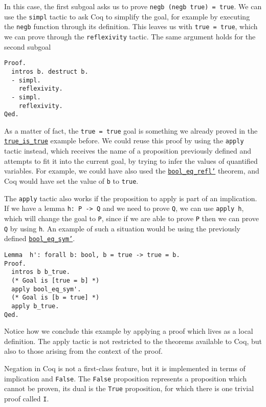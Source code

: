 In this case, the first subgoal asks us to prove \texttt{negb (negb true) = true}.
We can use the \texttt{simpl} tactic to ask Coq to simplify the goal, for example by executing
the \texttt{negb} function through its definition. This leaves us with 
\texttt{true = true}, which we can prove through the \texttt{reflexivity} tactic. The
same argument holds for the second subgoal

\begin{verbatim}
Proof.
  intros b. destruct b.
  - simpl.
    reflexivity.
  - simpl.
    reflexivity. 
Qed.
\end{verbatim}

As a matter of fact, the \texttt{true = true} goal is something we already proved in the
\hyperref[lst:true-is-true]{\texttt{true_is_true}} example before. We could reuse this proof
by using the \texttt{apply} tactic instead, which receives the name of a proposition previously
defined and attempts to fit it into the current goal, by trying to infer the values of quantified 
variables. For example, we could have also used the 
\hyperref[lst:bool-eq-refl]{\texttt{bool_eq_refl'}} theorem, and Coq would have set the value of
\texttt{b} to \texttt{true}.

The \texttt{apply} tactic also works if the proposition to apply is part of an implication.
If we have a lemma \texttt{h: P -> Q} and we need to prove \texttt{Q}, we can use
\texttt{apply h}, which will change the goal to \texttt{P}, since if we are able to
prove \texttt{P} then we can prove \texttt{Q} by using \texttt{h}. An example
of such a situation would be using the previously defined 
\hyperref[lst:bool-eq-sym]{\texttt{bool_eq_sym'}}.

\begin{verbatim}
Lemma  h': forall b: bool, b = true -> true = b.
Proof.
  intros b b_true.
  (* Goal is [true = b] *)
  apply bool_eq_sym'.
  (* Goal is [b = true] *)
  apply b_true.
Qed.
\end{verbatim}

Notice how we conclude this example by applying a proof which lives as a local definition. The apply 
tactic is not restricted to the theorems available to Coq, but also to those arising from the context
of the proof.

Negation in Coq is not a first-class feature, but it is implemented in terms of implication and 
\texttt{False}. The \texttt{False} proposition represents a proposition which cannot be
proven, its dual is the \texttt{True} proposition, for which there is one trivial proof called
\texttt{I}.

